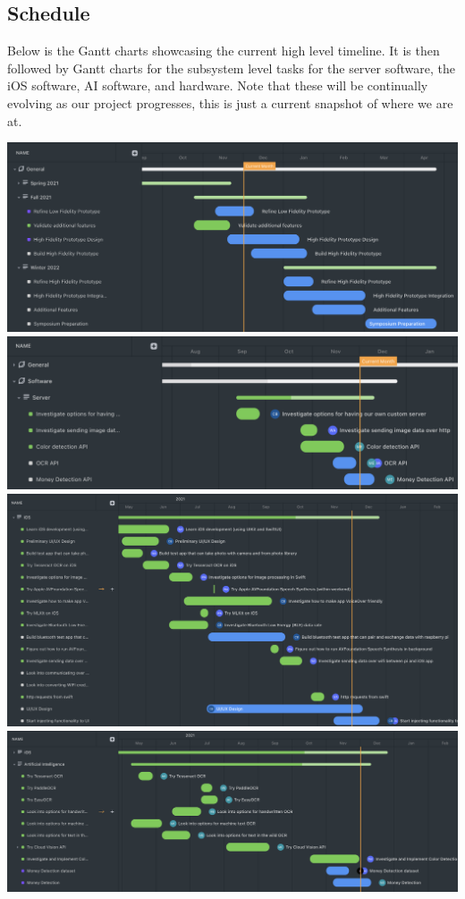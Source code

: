 \documentclass[a4paper,11pt]{article}
\begin{document}
\subsection{Schedule}
\label{schedule}
Below is the Gantt charts showcasing the current high level timeline. It is then followed by Gantt charts for the subsystem level tasks for the server software, the iOS software, AI software, and hardware. Note that these will be continually evolving as our project progresses, this is just a current snapshot of where we are at.
\begin{center}
    \includegraphics[width={1.0\linewidth}]{img/general-gantt.png}
    \includegraphics[width={1.0\linewidth}]{img/software-gantt-1.png}
    \includegraphics[width={1.0\linewidth}]{img/software-gantt-2.png}
    \includegraphics[width={1.0\linewidth}]{img/software-gantt-3.png}

\end{center}
\end{document}
